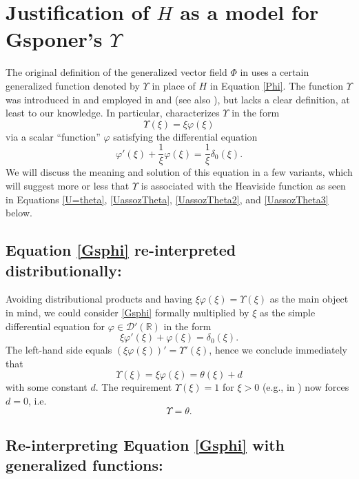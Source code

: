 \documentclass[sumlimits,intlimits,namelimits%
]{amsart}
\theoremstyle{definition}
\newcommand{\beq}{\begin{equation}}
\newcommand{\eeq}{\end{equation}}
\newcommand{\de}{\delta}
\newcommand{\vphi}{\varphi}
\begin{document}

\section{Justification of $H$ as a model for Gsponer's $\Upsilon$}\label{HUps} 
The original definition of the generalized vector field $\Phi$ in \cite[Equation (4.1)]{GEW} uses a certain generalized function denoted by $\Upsilon$ in place of $H$ in Equation \eqref{Phi}. The function $\Upsilon$ was introduced in \cite{GPOT} and employed in \cite{GEW} and \cite{GEJP} (see also \cite{GEJPCorr}), but lacks a clear definition, at least to our knowledge. In particular, \cite[Theorem in Section 6]{GPOT} characterizes $\Upsilon$ in the form 
\beq\label{UpsEqu}
  \Upsilon (\xi) = \xi \vphi(\xi)
\eeq
via a scalar ``function'' $\vphi$ satisfying the differential equation 
\beq\label{Gsphi}
  \vphi'(\xi) + \frac{1}{\xi} \vphi(\xi) = \frac{1}{\xi} \de_0(\xi). 
\eeq
We will discuss the meaning and solution of this equation in a few variants, which will suggest more or less that $\Upsilon$ is associated with the Heaviside function as seen in Equations \eqref{U=theta}, \eqref{UassozTheta}, \eqref{UassozTheta2}, and \eqref{UassozTheta3} below.

\subsection{Equation \eqref{Gsphi} re-interpreted distributionally:}\label{DistUps}

Avoiding distributional products and having $\xi \vphi(\xi) = \Upsilon(\xi)$ as the main object in mind, we could consider \eqref{Gsphi} formally multiplied by $\xi$ as the simple differential equation for $\vphi\in\mathcal{D}'(\mathbb{R})$ in the form 
\begin{equation}\label{eq2}
    \xi\varphi'(\xi)+\varphi(\xi)=\delta_0(\xi).
\end{equation}
The left-hand side equals $(\xi \vphi(\xi))' = \Upsilon'(\xi)$, hence we conclude immediately that
$$
   \Upsilon (\xi) = \xi  \vphi(\xi) = \theta(\xi) + d
$$
with some constant $d$. The requirement $\Upsilon(\xi) = 1$ for $\xi > 0$ (e.g., in \cite{GEW,GPOT}) now forces $d = 0$, i.e.
\beq\label{U=theta}
   \Upsilon = \theta.
\eeq

\subsection{Re-interpreting Equation \eqref{Gsphi} with generalized functions:} 
\end{document}
